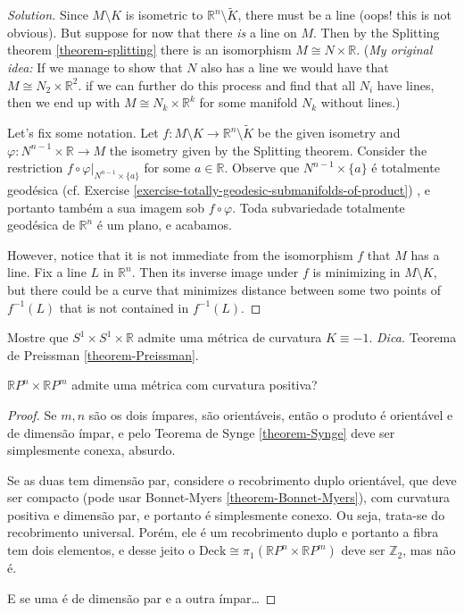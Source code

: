 \begin{proof}[Solution]
Since $M\setminus K$ is isometric to $\mathbb{R}^n\setminus \tilde{K}$, there
must be a line (oops! this is not obvious). But suppose for now that there {\it
is} a line on $M$. Then by the Splitting theorem \ref{theorem-splitting} there 
is an isomorphism $M \cong N \times \mathbb{R}$. ({\it My original idea:}
 If we manage to show that $N$ also has a line we would have that
 $M \cong N_2 \times \mathbb{R}^2$.  if we can further do this process and find
 that all $N_i$ have lines,
then we end up with $M \cong N_k \times \mathbb{R}^k$ for some manifold $N_k$
without lines.)

Let's fix some notation. Let 
$f:M\setminus K \to \mathbb{R}^n \setminus\tilde{K}$ be the given isometry and
$\varphi:N^{n-1}\times\mathbb{R} \to M$ the isometry given by the Splitting
theorem. Consider the restriction $f \circ \varphi |_{ N^{n-1}\times \{ a\}}$
for some $a \in \mathbb{R}$. Observe que $N^{n-1}\times \{ a\}$ é totalmente
geodésica (cf. Exercise \ref{exercise-totally-geodesic-submanifolds-of-product})
, e portanto também a sua imagem sob  $f \circ \varphi$. Toda subvariedade
totalmente geodésica de $\mathbb{R}^n$ é um plano, e acabamos.

However, notice that it is not immediate from the
isomorphism $f$ that $M$ has a line. Fix a line $L$ in $\mathbb{R}^n$. Then its
inverse image under $f$ is minimizing in $M \setminus K$, but there could be a
curve that minimizes distance between some two points of $f^{-1}(L)$ that is not
contained in $f^{-1}(L)$.
\end{proof}

\begin{exercise}
\label{exercise-S1xS1xR-admite-curvatura--1}
Mostre que $S^1 \times S^1 \times \mathbb{R}$ admite uma métrica de curvatura 
$K\equiv-1$. {\it Dica.} Teorema de Preissman \ref{theorem-Preissman}.
\end{exercise}

\begin{exercise}
\label{exercise-RPnxRPm-admite-curvatura-positiva}
$\mathbb{R}P^{n}\times \mathbb{R}P^{m}$ admite uma métrica com 
curvatura positiva?
\end{exercise}

\begin{proof}
Se $m,n$ são os dois ímpares, são orientáveis, então o produto é orientável e de
dimensão ímpar, e pelo Teorema de Synge \ref{theorem-Synge} deve ser
simplesmente conexa, absurdo.
 
Se as duas tem dimensão par, considere o recobrimento duplo orientável, que deve
ser compacto (pode usar Bonnet-Myers \ref{theorem-Bonnet-Myers}), com curvatura
positiva e dimensão par, e portanto é simplesmente conexo. Ou seja, trata-se do
recobrimento universal. Porém, ele é um recobrimento duplo e portanto a fibra
tem dois elementos, e desse jeito o $\text{Deck}\cong
\pi_{1}(\mathbb{R}P^{n}\times\mathbb{R}P^{m})$ deve ser $\mathbb{Z}_2$, mas não
é.

E se uma é de dimensão par e a outra ímpar…
\end{proof}

